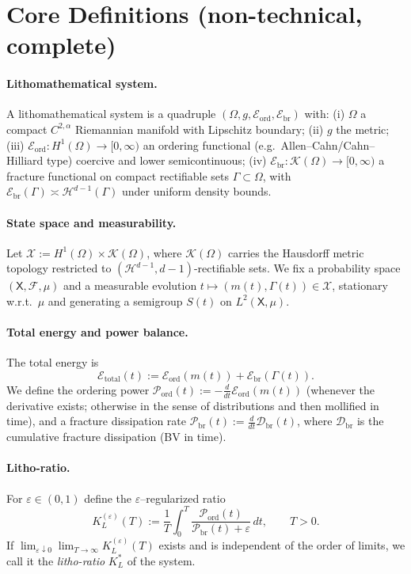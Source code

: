 \section*{Core Definitions (non-technical, complete)}
\paragraph{Lithomathematical system.}
A lithomathematical system is a quadruple $(\Omega,g,\mathcal{E}_{\mathrm{ord}},\mathcal{E}_{\mathrm{br}})$ with:
(i) $\Omega$ a compact $C^{2,\alpha}$ Riemannian manifold with Lipschitz boundary;
(ii) $g$ the metric;
(iii) $\mathcal{E}_{\mathrm{ord}}:H^1(\Omega)\to[0,\infty)$ an ordering functional
(e.g.\ Allen–Cahn/Cahn–Hilliard type) coercive and lower semicontinuous;
(iv) $\mathcal{E}_{\mathrm{br}}:\mathcal{K}(\Omega)\to[0,\infty)$ a fracture functional on compact
rectifiable sets $\Gamma\subset\Omega$, with $\mathcal{E}_{\mathrm{br}}(\Gamma)\asymp \mathcal{H}^{d-1}(\Gamma)$
under uniform density bounds.

\paragraph{State space and measurability.}
Let $\mathcal{X}:=H^1(\Omega)\times\mathcal{K}(\Omega)$, where $\mathcal{K}(\Omega)$ carries the Hausdorff
metric topology restricted to $(\mathcal{H}^{d-1},d-1)$-rectifiable sets.
We fix a probability space $(\mathsf{X},\mathcal{F},\mu)$ and a measurable evolution
$t\mapsto (m(t),\Gamma(t))\in\mathcal{X}$, stationary w.r.t.\ $\mu$ and generating a semigroup
$S(t)$ on $L^2(\mathsf{X},\mu)$.

\paragraph{Total energy and power balance.}
The total energy is
\[
\mathcal{E}_{\mathrm{total}}(t):=\mathcal{E}_{\mathrm{ord}}(m(t))+\mathcal{E}_{\mathrm{br}}(\Gamma(t)).
\]
We define the ordering power $\mathcal{P}_{\mathrm{ord}}(t):=-\frac{d}{dt}\mathcal{E}_{\mathrm{ord}}(m(t))$
(whenever the derivative exists; otherwise in the sense of distributions and then mollified in time),
and a fracture dissipation rate $\mathcal{P}_{\mathrm{br}}(t):=\frac{d}{dt}\mathcal{D}_{\mathrm{br}}(t)$,
where $\mathcal{D}_{\mathrm{br}}$ is the cumulative fracture dissipation (BV in time).

\paragraph{Litho-ratio.}
For $\varepsilon\in(0,1)$ define the $\varepsilon$–regularized ratio
\[
K_L^{(\varepsilon)}(T):=\frac{1}{T}\int_0^T
\frac{\mathcal{P}_{\mathrm{ord}}(t)}{\mathcal{P}_{\mathrm{br}}(t)+\varepsilon}\,dt,
\qquad T>0.
\]
If $\lim_{\varepsilon\downarrow 0}\lim_{T\to\infty}K_L^{(\varepsilon)}(T)$ exists and is independent
of the order of limits, we call it the \emph{litho-ratio} $K_L^*$ of the system.

